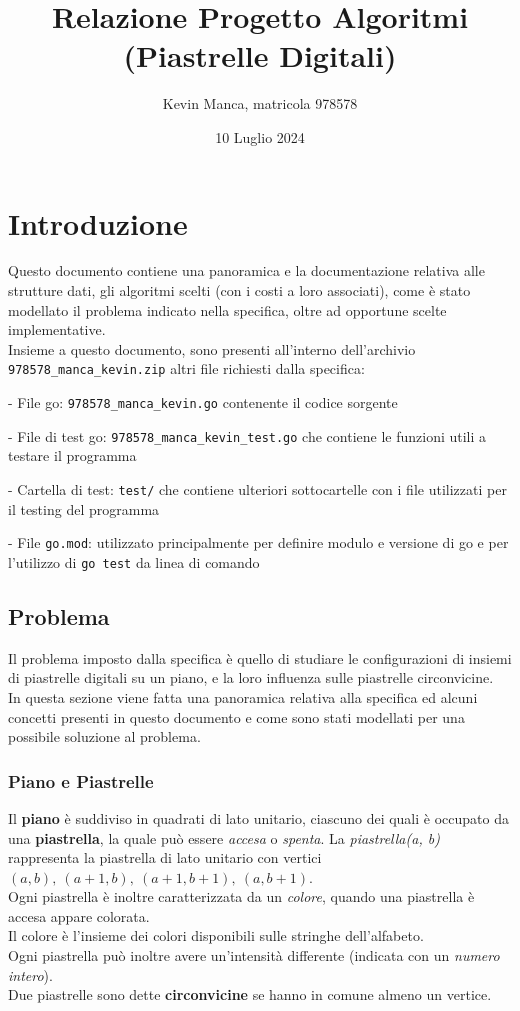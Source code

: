 \documentclass{article}
\title{Relazione Progetto Algoritmi\\ (Piastrelle Digitali)}
\author{Kevin Manca, matricola 978578}
\date{10 Luglio 2024}
\begin{document}
\maketitle
\tableofcontents

\section{Introduzione}\label{sec:intro}
Questo documento contiene una panoramica e la documentazione relativa alle strutture dati, gli algoritmi scelti (con i costi a loro associati), come è stato modellato il problema indicato nella specifica, oltre ad opportune scelte implementative.\\
Insieme a questo documento, sono presenti all'interno dell'archivio \texttt{978578\_manca\_kevin.zip}
altri file richiesti dalla specifica:
 
 - File go: \texttt{978578\_manca\_kevin.go} contenente il codice sorgente
 
 - File di test go: \texttt{978578\_manca\_kevin\_test.go} che contiene le funzioni utili a testare il programma

 - Cartella di test: \texttt{test/} che contiene ulteriori sottocartelle con i file utilizzati per il testing del programma

 - File \texttt{go.mod}: utilizzato principalmente per definire modulo e versione di go e per l'utilizzo di \texttt{go test} da linea di comando


\subsection{Problema}
Il problema imposto dalla specifica è quello di studiare le configurazioni di insiemi di piastrelle digitali su un piano, e la loro influenza sulle piastrelle circonvicine.\\
In questa sezione viene fatta una panoramica relativa alla specifica ed alcuni concetti presenti in questo documento e come sono stati modellati per una possibile soluzione al problema.  

\subsubsection{Piano e Piastrelle}\label{sec:tiles}
Il \textbf{piano} è suddiviso in quadrati di lato unitario, ciascuno dei quali è occupato da una \textbf{piastrella}, la quale può essere \textit{accesa} o \textit{spenta}.
La \textit{piastrella(a, b)} rappresenta la piastrella di lato unitario con vertici $(a, b),\ (a + 1, b),\ (a + 1, b + 1),\ (a, b + 1)$.\\
Ogni piastrella è inoltre caratterizzata da un \textit{colore}, quando una piastrella è accesa appare colorata.\\
Il colore è l'insieme dei colori disponibili sulle stringhe dell'alfabeto.\\
Ogni piastrella può inoltre avere un'intensità differente (indicata con un \textit{numero intero}).\\
Due piastrelle sono dette \textbf{circonvicine} se hanno in comune almeno un vertice.
\end{document}
